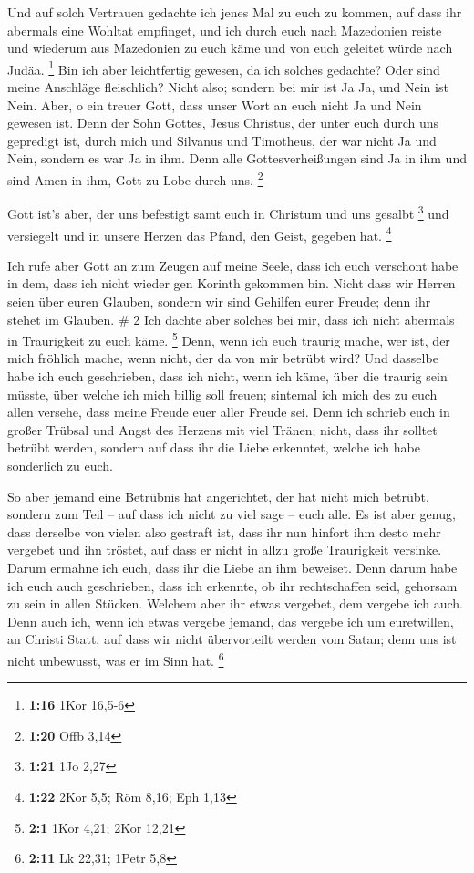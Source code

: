  Und auf solch Vertrauen gedachte ich jenes Mal zu euch
zu kommen, auf dass ihr abermals eine Wohltat empfinget, 
und ich durch euch nach Mazedonien reiste und wiederum aus Mazedonien zu
euch käme und von euch geleitet würde nach Judäa. \footnote{\textbf{1:16}
  1Kor 16,5-6}  Bin ich aber leichtfertig gewesen, da ich
solches gedachte? Oder sind meine Anschläge fleischlich? Nicht also;
sondern bei mir ist Ja Ja, und Nein ist Nein.  Aber, o
ein treuer Gott, dass unser Wort an euch nicht Ja und Nein gewesen ist.
 Denn der Sohn Gottes, Jesus Christus, der unter euch
durch uns gepredigt ist, durch mich und Silvanus und Timotheus, der war
nicht Ja und Nein, sondern es war Ja in ihm.  Denn alle
Gottesverheißungen sind Ja in ihm und sind Amen in ihm, Gott zu Lobe
durch uns. \footnote{\textbf{1:20} Offb 3,14}

 Gott ist's aber, der uns befestigt samt euch in Christum
und uns gesalbt \footnote{\textbf{1:21} 1Jo 2,27}  und
versiegelt und in unsere Herzen das Pfand, den Geist, gegeben hat.
\footnote{\textbf{1:22} 2Kor 5,5; Röm 8,16; Eph 1,13}

 Ich rufe aber Gott an zum Zeugen auf meine Seele, dass
ich euch verschont habe in dem, dass ich nicht wieder gen Korinth
gekommen bin.  Nicht dass wir Herren seien über euren
Glauben, sondern wir sind Gehilfen eurer Freude; denn ihr stehet im
Glauben. \# 2  Ich dachte aber solches bei mir, dass ich
nicht abermals in Traurigkeit zu euch käme. \footnote{\textbf{2:1} 1Kor
  4,21; 2Kor 12,21}  Denn, wenn ich euch traurig mache,
wer ist, der mich fröhlich mache, wenn nicht, der da von mir betrübt
wird?  Und dasselbe habe ich euch geschrieben, dass ich
nicht, wenn ich käme, über die traurig sein müsste, über welche ich mich
billig soll freuen; sintemal ich mich des zu euch allen versehe, dass
meine Freude euer aller Freude sei.  Denn ich schrieb euch
in großer Trübsal und Angst des Herzens mit viel Tränen; nicht, dass ihr
solltet betrübt werden, sondern auf dass ihr die Liebe erkenntet, welche
ich habe sonderlich zu euch.

 So aber jemand eine Betrübnis hat angerichtet, der hat
nicht mich betrübt, sondern zum Teil -- auf dass ich nicht zu viel sage
-- euch alle.  Es ist aber genug, dass derselbe von vielen
also gestraft ist,  dass ihr nun hinfort ihm desto mehr
vergebet und ihn tröstet, auf dass er nicht in allzu große Traurigkeit
versinke.  Darum ermahne ich euch, dass ihr die Liebe an
ihm beweiset.  Denn darum habe ich euch auch geschrieben,
dass ich erkennte, ob ihr rechtschaffen seid, gehorsam zu sein in allen
Stücken.  Welchem aber ihr etwas vergebet, dem vergebe
ich auch. Denn auch ich, wenn ich etwas vergebe jemand, das vergebe ich
um euretwillen, an Christi Statt,  auf dass wir nicht
übervorteilt werden vom Satan; denn uns ist nicht unbewusst, was er im
Sinn hat. \footnote{\textbf{2:11} Lk 22,31; 1Petr 5,8}

